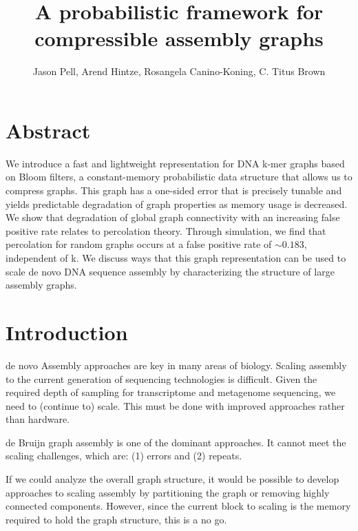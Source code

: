 \documentclass[12pt]{article} \usepackage{simplemargins}
\begin{document}
\title{A probabilistic framework for compressible assembly graphs}
\author{Jason Pell, Arend Hintze, Rosangela Canino-Koning, C. Titus Brown}

\maketitle

\section{Abstract}

We introduce a fast and lightweight representation for DNA k-mer graphs
based on Bloom filters, a constant-memory probabilistic data structure that allows us
to compress graphs.  This graph has a one-sided
error that is precisely tunable and yields predictable degradation of
graph properties as memory usage is decreased. We show that degradation of global graph connectivity with an increasing false
positive rate relates to percolation theory. Through 
simulation, we find that percolation for random graphs occurs at a false positive rate 
of $\sim0.183$, independent of k. We discuss ways that this
graph representation can be used to scale de novo DNA sequence assembly by characterizing the structure of
large assembly graphs.

\section{Introduction}

de novo Assembly approaches are key in many areas of biology.  Scaling
assembly to the current generation of sequencing technologies is
difficult.  Given the required depth of sampling for transcriptome and
metagenome sequencing, we need to (continue to) scale.  This must be
done with improved approaches rather than hardware.

de Bruijn graph assembly is one of the dominant 
approaches\cite{trinity, panda, pmid21273488, pmid20203603}. 
It cannot meet the scaling challenges, which
are: (1) errors and (2) repeats.  

If we could analyze the overall graph structure, it would be possible
to develop approaches to scaling assembly by partitioning the graph or
removing highly connected components.  However, since the current
block to scaling is the memory required to hold the graph structure,
this is a no go.
\end{document}
